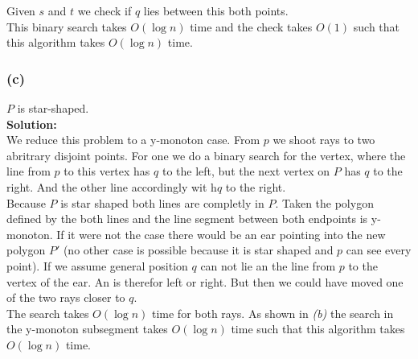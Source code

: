 \documentclass[11pt,a4paper,ngerman]{article}
\begin{document}
Given $s$ and $t$ we check if $q$ lies between this both points.\\

This binary search takes $O(\log n)$ time and the check takes $O(1)$ such that this algorithm takes $O(\log n)$ time.

\subsubsection*{(c)}

$P$ is star-shaped.\\

\textbf{Solution:}\\

We reduce this problem to a y-monoton case. From $p$ we shoot rays to two abritrary disjoint points. For one we do a
binary search for the vertex, where the line from $p$ to this vertex has $q$ to the left, but the next vertex on $P$ has
$q$ to the right. And the other line accordingly wit h$q$ to the right.\\

Because $P$ is star shaped both lines are completly in $P$. Taken the polygon defined by the both lines and the line segment
between both endpoints is y-monoton. If it were not the case there would be an ear pointing into the new polygon $P'$ (no
other case is possible because it is star shaped and $p$ can see every point). If we assume general position $q$ can not lie
an the line from $p$ to the vertex of the ear. An is therefor left or right. But then we could have moved one of the two rays
closer to $q$.\\

The search takes $O(\log n)$ time for both rays. As shown in \emph{(b)} the search in the y-monoton subsegment takes $O(\log n)$ time
such that this algorithm takes $O(\log n)$ time.

\label{LastPage}
\end{document}
